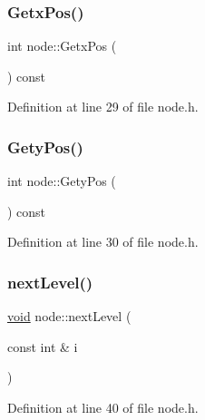 \subsubsection{\texorpdfstring{Getx\+Pos()}{GetxPos()}}
{\footnotesize\ttfamily int node\+::\+Getx\+Pos (\begin{DoxyParamCaption}{ }\end{DoxyParamCaption}) const\hspace{0.3cm}{\ttfamily [inline]}}



Definition at line 29 of file node.\+h.

\mbox{\label{classnode_a0d644ed02899013bdc6e222afefb4c25}} 
\subsubsection{\texorpdfstring{Gety\+Pos()}{GetyPos()}}
{\footnotesize\ttfamily int node\+::\+Gety\+Pos (\begin{DoxyParamCaption}{ }\end{DoxyParamCaption}) const\hspace{0.3cm}{\ttfamily [inline]}}



Definition at line 30 of file node.\+h.

\mbox{\label{classnode_a04a186013c42fb942b6da90d2e98d4ed}} 
\subsubsection{\texorpdfstring{next\+Level()}{nextLevel()}}
{\footnotesize\ttfamily \mbox{\hyperlink{glad_8h_a950fc91edb4504f62f1c577bf4727c29}{void}} node\+::next\+Level (\begin{DoxyParamCaption}\item[{const int \&}]{i }\end{DoxyParamCaption})\hspace{0.3cm}{\ttfamily [inline]}}



Definition at line 40 of file node.\+h.

\mbox{\label{classnode_ad51b92de008bd5107a7b55cc61fc497b}} 
